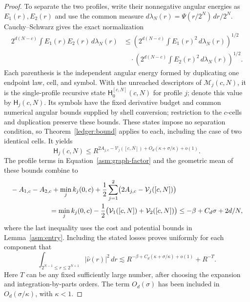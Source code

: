 \begin{proof}
To separate the two profiles, write their nonnegative angular
energies as $E_1(r),E_2(r)$ and use the common measure
$d\lambda_N(r)=\Psi(r/2^N)\,dr/2^N$.  Cauchy--Schwarz gives the exact
normalization
\begin{equation}
 \label{asm:two-profile-cs}
 \begin{split}
 2^{d(N-c)}\int E_1(r)E_2(r)\,d\lambda_N(r)
 &\le
 \left(2^{d(N-c)}\int E_1(r)^2\,d\lambda_N(r)\right)^{1/2}\\
 &\quad\cdot
 \left(2^{d(N-c)}\int E_2(r)^2\,d\lambda_N(r)\right)^{1/2}.
 \end{split}
\end{equation}
Each parenthesis is the independent angular energy formed by
duplicating one endpoint law, cell, and symbol.  With the unreached
descriptors of $\mathcal M_j(c,N)$, it is the single-profile recursive
state $\mathsf H_0^{[c,N]}(c,N)$ for profile $j$; denote this value by
$\mathsf H_j(c,N)$.  Its symbols have the fixed derivative budget and
common numerical angular bounds supplied by shell conversion;
restriction to the $c$-cells and duplication preserve these bounds.
These states impose no separation condition, so
Theorem~\ref{ledger:bound} applies to each, including the case of two
identical cells.  It yields
\[
 \mathsf H_j(c,N)
 \le R^{2A_{j,c}-\mathcal V_j([c,N])
                         +O_d(\kappa+\sigma/\kappa)+o(1)}.
\]
The profile terms in Equation~\eqref{asm:graph-factor} and the
geometric mean of these bounds combine to
\begin{equation}
 \label{asm:entry-cancellation}
 \begin{split}
 &-A_{1,c}-A_{2,c}+\min_j k_j(0,c)
       +\frac12\sum_{j=1}^2
                    \bigl(2A_{j,c}-\mathcal V_j([c,N])\bigr)\\
 &\hspace{20mm}
 =\min_j k_j(0,c)-\frac12
                     \bigl(\mathcal V_1([c,N])+\mathcal V_2([c,N])\bigr)
 \le-\beta+C_d\sigma+2d/N,
 \end{split}
\end{equation}
where the last inequality uses the cost and potential bounds in
Lemma~\ref{asm:entry}.  Including the stated losses proves uniformly
for each component that
\begin{equation}
 \label{asm:component-shell}
 \int_{2^{N-1}\le r\le2^{N+1}}|\widehat\nu(r)|^2\,dr
 \lesssim
 R^{-\beta+C_d(\kappa+\sigma/\kappa)+o(1)}+R^{-T}.
\end{equation}
Here $T$ can be any fixed sufficiently large number, after choosing
the expansion and integration-by-parts orders.  The term $O_d(\sigma)$
has been included in $O_d(\sigma/\kappa)$, with $\kappa<1$.


\end{proof}
